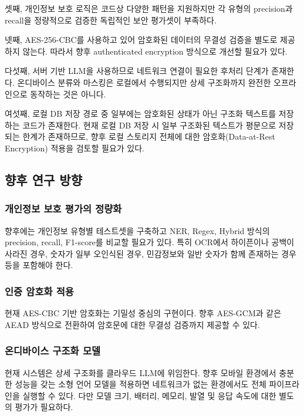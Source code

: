 \documentclass[11pt,a4paper]{article}
\begin{document}
셋째, 개인정보 보호 로직은 코드상 다양한 패턴을 지원하지만 각 유형의 precision과 recall을 정량적으로 검증한 독립적인 보안 평가셋이 부족하다.

넷째, AES-256-CBC를 사용하고 있어 암호화된 데이터의 무결성 검증을 별도로 제공하지 않는다. 따라서 향후 authenticated encryption 방식으로 개선할 필요가 있다.

다섯째, 서버 기반 LLM을 사용하므로 네트워크 연결이 필요한 후처리 단계가 존재한다. 온디바이스 분류와 마스킹은 로컬에서 수행되지만 상세 구조화까지 완전한 오프라인으로 동작하는 것은 아니다.

여섯째, 로컬 DB 저장 경로 중 일부에는 암호화된 상태가 아닌 구조화 텍스트를 저장하는 코드가 존재한다. 현재 로컬 DB 저장 시 일부 구조화된 텍스트가 평문으로 저장되는 한계가 존재하므로, 향후 로컬 스토리지 전체에 대한 암호화(Data-at-Rest Encryption) 적용을 검토할 필요가 있다.

\subsection{향후 연구 방향}

\subsubsection{개인정보 보호 평가의 정량화}

향후에는 개인정보 유형별 테스트셋을 구축하고 NER, Regex, Hybrid 방식의 precision, recall, F1-score를 비교할 필요가 있다. 특히 OCR에서 하이픈이나 공백이 사라진 경우, 숫자가 일부 오인식된 경우, 민감정보와 일반 숫자가 함께 존재하는 경우 등을 포함해야 한다.

\subsubsection{인증 암호화 적용}

현재 AES-CBC 기반 암호화는 기밀성 중심의 구현이다. 향후 AES-GCM과 같은 AEAD 방식으로 전환하여 암호문에 대한 무결성 검증까지 제공할 수 있다.

\subsubsection{온디바이스 구조화 모델}

현재 시스템은 상세 구조화를 클라우드 LLM에 위임한다. 향후 모바일 환경에서 충분한 성능을 갖는 소형 언어 모델을 적용하면 네트워크가 없는 환경에서도 전체 파이프라인을 실행할 수 있다. 다만 모델 크기, 배터리, 메모리, 발열 및 응답 속도에 대한 별도의 평가가 필요하다.
\end{document}
